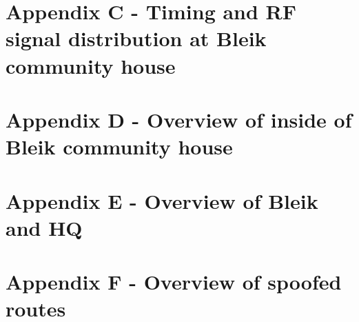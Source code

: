\documentclass[a4paper]{book}
\begin{document}
\section{Appendix C - Timing and RF signal distribution at Bleik community house}


\section{Appendix D - Overview of inside of Bleik community house}


\section{Appendix E - Overview of Bleik and HQ}


\section{Appendix F - Overview of spoofed routes}

\end{document}
